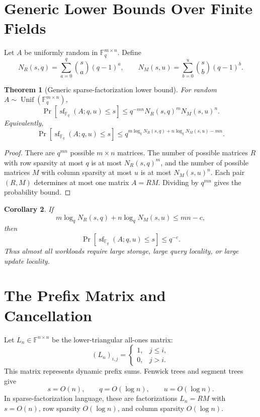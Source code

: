 \documentclass[11pt]{article}
\newtheorem{theorem}{Theorem}[section]
\newtheorem{corollary}[theorem]{Corollary}
\begin{document}
\section{Generic Lower Bounds Over Finite Fields}

Let $A$ be uniformly random in $\mathbb F_q^{m\times n}$. Define
\[
N_R(s,q)=\sum_{a=0}^q {s\choose a}(q-1)^a,
\qquad
N_M(s,u)=\sum_{b=0}^u {s\choose b}(q-1)^b.
\]

\begin{theorem}[Generic sparse-factorization lower bound]
For random $A\sim \operatorname{Unif}(\mathbb F_q^{m\times n})$,
\[
\Pr[\operatorname{sf}_{\mathbb F_q}(A;q,u)\le s]
\le
q^{-mn}N_R(s,q)^mN_M(s,u)^n.
\]
Equivalently,
\[
\Pr[\operatorname{sf}_{\mathbb F_q}(A;q,u)\le s]
\le
q^{m\log_q N_R(s,q)+n\log_q N_M(s,u)-mn}.
\]
\end{theorem}

\begin{proof}
There are $q^{mn}$ possible $m\times n$ matrices. The number of possible matrices $R$ with row sparsity at most $q$ is at most $N_R(s,q)^m$, and the number of possible matrices $M$ with column sparsity at most $u$ is at most $N_M(s,u)^n$. Each pair $(R,M)$ determines at most one matrix $A=RM$. Dividing by $q^{mn}$ gives the probability bound.
\end{proof}

\begin{corollary}
If
\[
m\log_q N_R(s,q)+n\log_q N_M(s,u)\le mn-c,
\]
then
\[
\Pr[\operatorname{sf}_{\mathbb F_q}(A;q,u)\le s]\le q^{-c}.
\]
Thus almost all workloads require large storage, large query locality, or large update locality.
\end{corollary}

\section{The Prefix Matrix and Cancellation}

Let $L_n\in\mathbb F^{n\times n}$ be the lower-triangular all-ones matrix:
\[
(L_n)_{i,j}
=
\begin{cases}
1,&j\le i,\\
0,&j>i.
\end{cases}
\]
This matrix represents dynamic prefix sums. Fenwick trees and segment trees give
\[
s=O(n),
\qquad
q=O(\log n),
\qquad
u=O(\log n).
\]
In sparse-factorization language, these are factorizations $L_n=RM$ with $s=O(n)$, row sparsity $O(\log n)$, and column sparsity $O(\log n)$.
\end{document}
